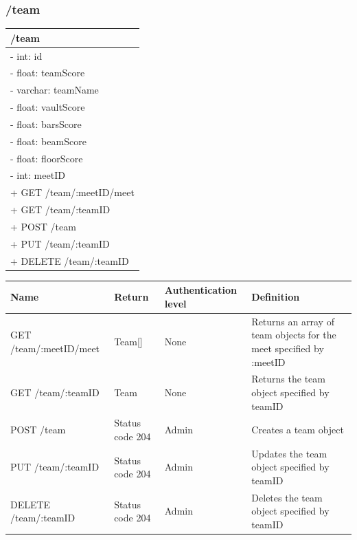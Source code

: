 \documentclass[letterpaper,10pt,draftclsnofoot,onecolumn,]{article}
\begin{document}
\subsubsection{/team}
\begin{center}
    \begin{tabular}{| p{20em} |}
        \hline
        \textbf{/team} \\
        \hline
        - int: id \\
        - float: teamScore \\
        - varchar: teamName \\
        - float: vaultScore \\
        - float: barsScore \\
        - float: beamScore \\
        - float: floorScore \\
        - int: meetID \\
        \hline
        + GET /team/:meetID/meet \\
        + GET /team/:teamID \\
        + POST /team \\
        + PUT /team/:teamID \\
        + DELETE /team/:teamID \\
        \hline
    \end{tabular}
\end{center}
\begin{center}
    \begin{tabular}{ | p{15em} | p{8em} | p{7em} | p{20em} | }
        \hline
        \textbf{Name} & \textbf{Return} & \textbf{Authentication level} & \textbf{Definition} \\
        \hline
        GET /team/:meetID/meet & Team[] & None & Returns an array of team objects for the meet specified by :meetID \\
        \hline
        GET /team/:teamID & Team & None & Returns the team object specified by teamID \\
        \hline
        POST /team & Status code 204 & Admin & Creates a team object \\
        \hline
        PUT /team/:teamID & Status code 204 & Admin & Updates the team object specified by teamID \\
        \hline
        DELETE /team/:teamID & Status code 204 & Admin & Deletes the team object specified by teamID \\
        \hline
    \end{tabular}
\end{center}
\end{document}
